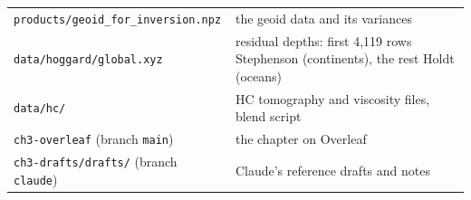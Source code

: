 \begin{center}
\begin{longtable}{p{}p{}}
\texttt{products/geoid\_for\_inversion.npz} & the geoid data and its variances\\
\texttt{data/hoggard/global.xyz} & residual depths: first 4,119 rows Stephenson (continents), the rest Holdt (oceans)\\
\texttt{data/hc/} & HC tomography and viscosity files, blend script\\
\texttt{ch3-overleaf} (branch \texttt{main}) & the chapter on Overleaf\\
\texttt{ch3-drafts/drafts/} (branch \texttt{claude}) & Claude's reference drafts and notes\\
\bottomrule
\end{longtable}
\end{center}

